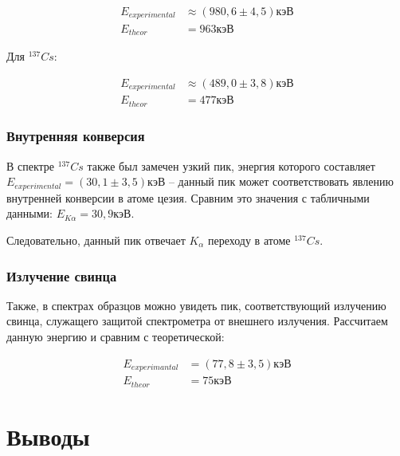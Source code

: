 \documentclass[a4paper,12pt]{article}
\begin{document}
\begin{align*}
	E_{experimental} &\approx (980,6 \pm 4,5)  кэВ \\
	E_{theor} &= 963 кэВ
\end{align*}

Для  $^{137}Cs$:

\begin{align*}
	E_{experimental} &\approx (489,0 \pm 3,8)  кэВ \\
	E_{theor} &= 477 кэВ
\end{align*}

\subsubsection*{Внутренняя конверсия}

В спектре $^{137}Cs$ также был замечен узкий пик, энергия которого составляет $E_{experimental} = (30,1 \pm 3,5) кэВ$ -- данный пик может соответствовать явлению внутренней конверсии в атоме цезия. Сравним это значения с табличными данными: $E_{K \alpha} = 30,9 кэВ$. 

Следовательно, данный пик отвечает $K_{\alpha}$ переходу в атоме $^{137}Cs$.
 
\newpage

\subsubsection*{Излучение свинца}

Также, в спектрах образцов можно увидеть пик, соответствующий излучению свинца, служащего защитой спектрометра от внешнего излучения. Рассчитаем данную энергию и сравним с теоретической:

\begin{align*}
	E_{experimantal} &= (77,8 \pm 3,5) кэВ\\
	E_{theor} &= 75 кэВ
\end{align*}

\section*{Выводы} 
 
\end{document}
